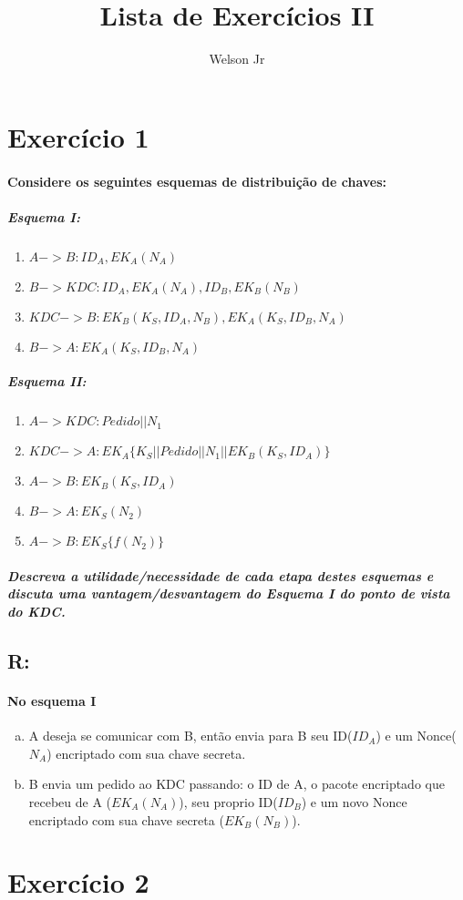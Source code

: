 \documentclass[10pt,a4paper]{report}
\author{Welson Jr}
\title{Lista de Exercícios II}
\begin{document}
\section*{Exercício 1} 
\paragraph{ Considere os seguintes esquemas de distribuição de chaves:}
\subparagraph{ Esquema I:}
\begin{enumerate}[(1)]
\item $A -> B: ID_A, EK_A(N_A)$
\item $B -> KDC: ID_A, EK_A(N_A), ID_B, EK_B(N_B)$
\item $KDC -> B: EK_B(K_S, ID_A, N_B), EK_A(K_S, ID_B, N_A)$
\item $B -> A: EK_A(K_S, ID_B, N_A)$
\end{enumerate}
\subparagraph{ Esquema II:}
\begin{enumerate}[(1)]
\item $A -> KDC: Pedido || N_1$
\item $KDC -> A: EK_A\{K_S || Pedido || N_1 || EK_B(K_S, ID_A)\}$
\item $A -> B: EK_B(K_S, ID_A)$
\item $B -> A: EK_S(N_2)$
\item $A -> B: EK_S\{ f(N_2) \}$
\end{enumerate}
\subparagraph{
Descreva a utilidade/necessidade de cada etapa destes esquemas e discuta uma vantagem/desvantagem do Esquema I do ponto de vista do KDC.}
\subsection*{R:}
\paragraph*{No esquema I}
\begin{enumerate}[(a)]
\item A deseja se comunicar com B, então envia para B seu ID($ID_A$) e um Nonce($N_A$) encriptado com sua chave secreta.
\item B envia um pedido ao KDC passando: o ID de A, o pacote encriptado que recebeu de A ($EK_A(N_A)$), seu proprio ID($ID_B$) e um novo Nonce encriptado com sua chave secreta ($EK_B(N_B)$).
\end{enumerate}

\section*{Exercício 2}
\end{document}
